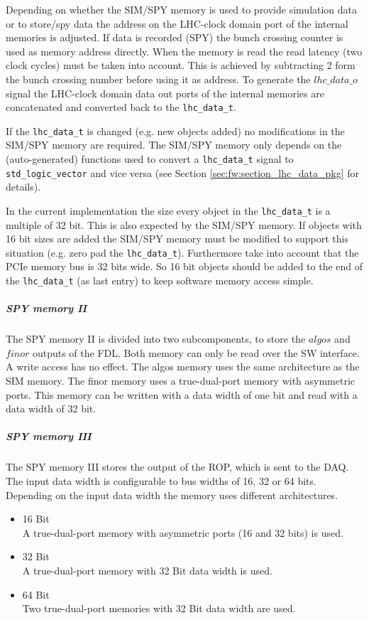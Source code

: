 Depending on whether the SIM/SPY memory is used to provide simulation data or to store/spy data the address on the LHC-clock domain port of the internal memories is adjusted.
If data is recorded (SPY) the bunch crossing counter is used as memory address directly.
When the memory is read the read latency (two clock cycles) must be taken into account.
This is achieved by subtracting 2 form the bunch crossing number before using it as address.
To generate the $lhc\_data\_o$ signal the LHC-clock domain data out ports of the internal memories are concatenated and converted back to the \texttt{lhc\_data\_t}.

If the \texttt{lhc\_data\_t} is changed (e.g. new objects added) no modifications in the SIM/SPY memory are required. The SIM/SPY memory only depends on the (auto-generated)
functions used to convert a \texttt{lhc\_data\_t} signal to \texttt{std\_logic\_vector} and vice versa (see Section \ref{sec:fw:section_lhc_data_pkg} for details).

In the current implementation the size every object in the \texttt{lhc\_data\_t} is a multiple of 32 bit. This is also expected by the SIM/SPY memory. If objects with 16 bit sizes
are added the SIM/SPY memory must be modified to support this situation (e.g. zero pad the \texttt{lhc\_data\_t}). Furthermore take into account that the PCIe memory bus is 32 bits wide.
So 16 bit objects should be added to the end of the \texttt{lhc\_data\_t} (as last entry) to keep software memory access simple.

\subparagraph{SPY memory II}
The SPY memory II is divided into two subcomponents, to store the $algos$ and $finor$ outputs of the FDL.
Both memory can only be read over the SW interface. A write access has no effect.
The algos memory uses the same architecture as the SIM memory.
The finor memory uses a true-dual-port memory with asymmetric ports. This memory can be written with a data width of one bit and read with a data width of 32 bit.

%
\subparagraph{SPY memory III}
The SPY memory III stores the output of the ROP, which is sent to the DAQ. The input data width is configurable to bus widths of 16, 32 or 64 bits.
Depending on the input data width the memory uses different architectures.
\begin{itemize}
\item 16 Bit \\
A true-dual-port memory with asymmetric ports (16 and 32 bits) is used.
\item 32 Bit \\
A true-dual-port memory with 32 Bit data width is used.
\item 64 Bit \\
Two true-dual-port memories with 32 Bit data width are used.
\end{itemize}

